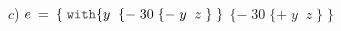 \vspace*{0.3cm}
$c$) $e\: =\: \{\; \code{with} \{y\;\; \{-\; 30\; \{-\; y\;\; z\; \}\; \} $ \newline
\hspace*{1.5cm} $\{-\; 30\; \{+\; y\;\; z\; \}\; \}$                       \newline
\hspace*{0.3cm} 
